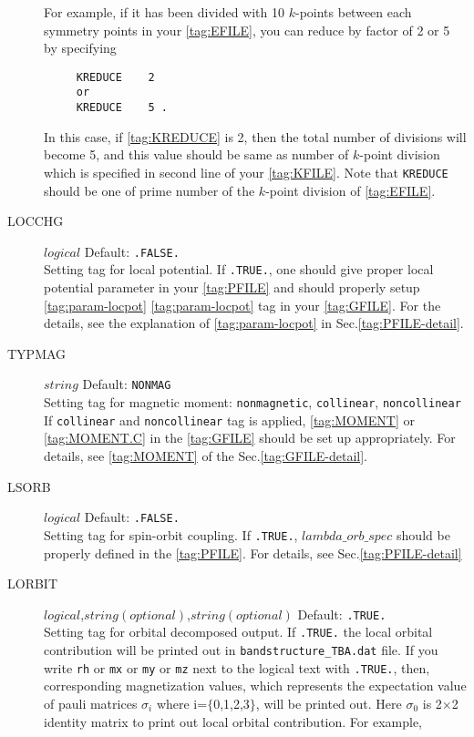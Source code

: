 \documentclass[a4paper,12pt]{scrartcl}
\makeatletter
\def\namedlabel#1#2{\begingroup
    #2%
    \def\@currentlabel{#2}%
    \phantomsection\label{#1}\endgroup
}
\makeatother
\begin{document}
\begin{description}
		For example, if it has been divided with 10 $k$-points between each symmetry points in your \ref{tag:EFILE}, you can reduce by factor of 2 or 5 by specifying 
     \begin{verbatim}
     KREDUCE    2
     or
     KREDUCE    5 .
     \end{verbatim}
	  In this case, if \ref{tag:KREDUCE} is 2, then the total number of divisions will
	  become 5, and this value should be same as number of $k$-point division 
	  which is specified in second line of your \ref{tag:KFILE}. 
	  Note that \texttt{KREDUCE} should be one of prime number of the 
	  $k$-point division of \ref{tag:EFILE}. 
	  
    \item[\namedlabel{tag:LOCCHG}{LOCCHG}] $logical$ Default: \texttt{.FALSE.} \\
        Setting tag for local potential.
        If \texttt{.TRUE.}, one should give proper local potential parameter 
		in your \ref{tag:PFILE} and should properly setup \ref{tag:param-locpot} \ref{tag:param-locpot} 
		tag in your \ref{tag:GFILE}. For the details, see the explanation of
		\ref{tag:param-locpot} in Sec.\ref{tag:PFILE-detail}.

    \item[\namedlabel{tag:TYPMAG}{TYPMAG}] $string$ Default: \texttt{NONMAG} \\
        Setting tag for magnetic moment: \texttt{nonmagnetic}, \texttt{collinear}, 
		\texttt{noncollinear}
		If \texttt{collinear} and \texttt{noncollinear} tag is applied, 
		\ref{tag:MOMENT} or \ref{tag:MOMENT.C} in the \ref{tag:GFILE}
		should be set up appropriately.
		For details, see \ref{tag:MOMENT} of the Sec.\ref{tag:GFILE-detail}.

    \item[\namedlabel{tag:LSORB}{LSORB}] $logical$ Default: \texttt{.FALSE.} \\
        Setting tag for spin-orbit coupling. 
		If \texttt{.TRUE.}, $lambda\_orb\_spec$ should be properly defined in the
		\ref{tag:PFILE}. For details, see Sec.\ref{tag:PFILE-detail}

    \item[\namedlabel{tag:LORBIT}{LORBIT}] $logical$,$string (optional)$,$string (optional)$ Default: \texttt{.TRUE.} \\
        Setting tag for orbital decomposed output.
		If \texttt{.TRUE.} the local orbital contribution will be printed out
		in \texttt{bandstructure\_TBA.dat} file.
        If you write \texttt{rh} or \texttt{mx} or \texttt{my} or \texttt{mz} next to the logical text with \texttt{.TRUE.},
        then, corresponding magnetization values, which represents
        the expectation value of pauli matrices $\sigma_{i}$ where i=$\{$0,1,2,3$\}$, 
        will be printed out. Here $\sigma_{0}$ is 2$\times$2 identity 
        matrix to print out local orbital contribution. For example,   
        

\end{description}
\end{document}
